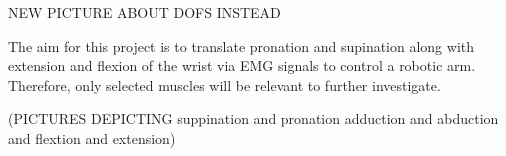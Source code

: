 
NEW PICTURE ABOUT DOFS INSTEAD

The aim for this project is to translate pronation and supination along with extension and flexion of the wrist via EMG signals to control a robotic arm. Therefore, only selected muscles will be relevant to further investigate. 

(PICTURES DEPICTING suppination and pronation adduction and abduction and flextion and extension)

